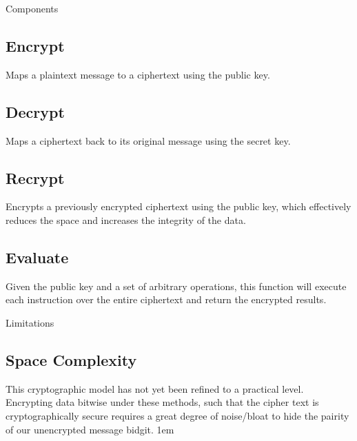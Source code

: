 \documentclass[a0,portrait]{a0poster}
\begin{document}
\begin{multicols}{2}
\begin{slide}{Components}
\subsection*{Encrypt}
\hspace{1em}Maps a plaintext message to a ciphertext using the public key.

\subsection*{Decrypt}
\hspace{1em}Maps a ciphertext back to its original message using the secret key.

\subsection*{Recrypt}
\hspace{1em}Encrypts a previously encrypted ciphertext using the public key, which effectively reduces the space and increases the integrity of the data. 

\subsection*{Evaluate}
\hspace{1em}Given the public key and a set of arbitrary operations, this function will execute each instruction over the entire ciphertext and return the encrypted results.
\end{slide}

\begin{slide}{Limitations}
\subsection*{Space Complexity}
  This cryptographic model has not yet been refined to a practical level. Encrypting data bitwise under these methods, such that the cipher text is cryptographically secure requires a great degree of noise/bloat to hide the pairity of our unencrypted message bidgit. 
\parskip 1em




\end{slide}
\end{multicols}
\end{document}
